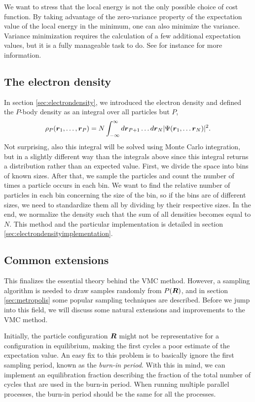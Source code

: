 We want to stress that the local energy is not the only possible choice of cost function. By taking advantage of the zero-variance property of the expectation value of the local energy in the minimum, one can also minimize the variance. Variance minimization requires the calculation of a few additional expectation values, but it is a fully manageable task to do. See for instance \citet{umrigar_energy_2005} for more information.

\subsection{The electron density} \label{sec:electrondensityqmc}
In section \ref{sec:electrondensity}, we introduced the electron density and defined the $P$-body density as an integral over all particles but $P$,
\begin{equation}
\rho_P(\boldsymbol{{r}}_1,\hdots,\boldsymbol{{r}}_P)=N\int_{-\infty}^{\infty}d\boldsymbol{{r}}_{P+1}\hdots d\boldsymbol{{r}}_N |\Psi(\boldsymbol{{r}}_1,\hdots \boldsymbol{{r}}_N)|^2.
\end{equation}
Not surprising, also this integral will be solved using Monte Carlo integration, but in a slightly different way than the integrals above since this integral returns a distribution rather than an expected value. First, we divide the space into bins of known sizes. After that, we sample the particles and count the number of times a particle occurs in each bin. We want to find the relative number of particles in each bin concerning the size of the bin, so if the bins are of different sizes, we need to standardize them all by dividing by their respective sizes. In the end, we normalize the density such that the sum of all densities becomes equal to $N$. This method and the particular implementation is detailed in section \ref{sec:electrondensityimplementation}.

\subsection{Common extensions}
This finalizes the essential theory behind the VMC method. However, a sampling algorithm is needed to draw samples randomly from $P(\boldsymbol{{R}})$, and in section \ref{sec:metropolis} some popular sampling techniques are described. Before we jump into this field, we will discuss some natural extensions and improvements to the VMC method.

Initially, the particle configuration $\boldsymbol{{R}}$ might not be representative for a configuration in equilibrium, making the first cycles a poor estimate of the expectation value. An easy fix to this problem is to basically ignore the first sampling period, known as the \textit{burn-in period}. With this in mind, we can implement an equilibration fraction describing the fraction of the total number of cycles that are used in the burn-in period. When running multiple parallel processes, the burn-in period should be the same for all the processes.

